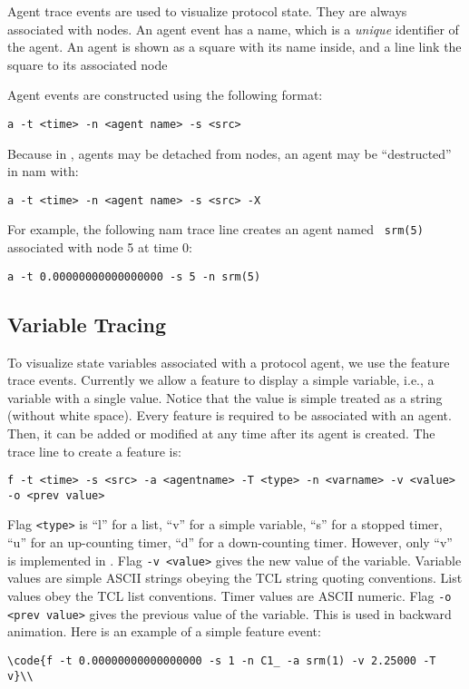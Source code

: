 Agent trace events are used to visualize protocol state.
They are always associated with nodes. 
An agent event has a name, which is a {\it unique} identifier of the
agent. 
An agent is shown as a square with its name inside, and a line link
the square to its associated node 

Agent events are constructed using the following format:
\begin{verbatim}
a -t <time> -n <agent name> -s <src> 
\end{verbatim}
Because in \ns, agents may be detached from nodes, an agent may be 
``destructed'' in nam with:
\begin{verbatim}
a -t <time> -n <agent name> -s <src> -X
\end{verbatim}
For example, the following nam trace line creates an agent named {\tt
  srm(5)} associated with node 5 at time 0:
\begin{verbatim}
a -t 0.00000000000000000 -s 5 -n srm(5)
\end{verbatim}

\subsection{Variable Tracing}

To visualize state variables associated with a protocol agent, we use
the feature trace events.
Currently we allow a feature to display a simple variable, i.e., a
variable with a single value. 
Notice that the value is simple treated as a string (without
white space).
Every feature is required to be associated with an agent. 
Then, it can be added or modified at any time after its agent is created.
The trace line to create a feature is:
\begin{verbatim}
f -t <time> -s <src> -a <agentname> -T <type> -n <varname> -v <value> -o <prev value>
\end{verbatim}
Flag {\tt <type>} is ``l'' for a list, ``v'' for a simple variable, ``s''
for a stopped timer, ``u'' for an up-counting timer, ``d'' for a
down-counting timer.
However, only ``v'' is implemented in \ns. 
Flag {\tt -v <value>} gives the new value of the variable. 
Variable values are simple ASCII strings obeying the TCL string
quoting conventions. 
List values obey the TCL list conventions. 
Timer values are ASCII numeric. 
Flag {\tt -o <prev value>} gives the previous value of the variable. 
This is used in backward animation. 
Here is an example of a simple feature event:
\begin{verbatim}
\code{f -t 0.00000000000000000 -s 1 -n C1_ -a srm(1) -v 2.25000 -T v}\\
\end{verbatim}

